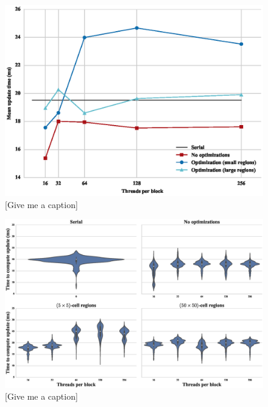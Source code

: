 \documentclass[onecolumn,12pt]{IEEEtran}
\begin{document}
\begin{figure}[t]
    \centering
    \includegraphics[width=\textwidth]{../images/plot.eps}
    \caption{[Give me a caption]}
    \label{fig:comparison}
\end{figure}

\begin{figure}[t]
    \centering
    \includegraphics[width=\textwidth]{../images/boxplot.eps}
    \caption{[Give me a caption]}
    \label{fig:boxplots}
\end{figure}
\end{document}
